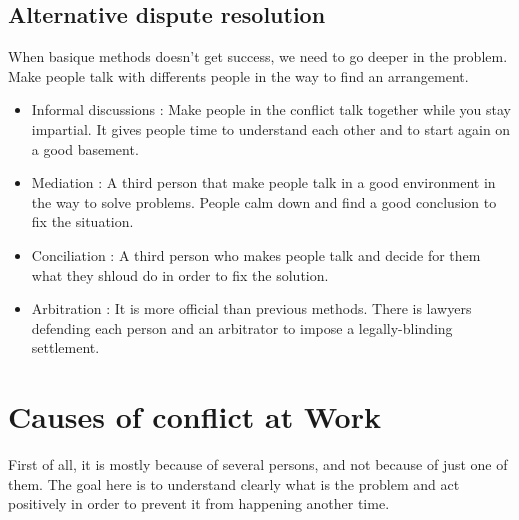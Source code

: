 \documentclass[a4paper,12pt]{report} %
\begin{document}
\subsection{Alternative dispute resolution}
When basique methods doesn't get success, we need to go deeper in the problem. Make people talk with differents people in the way to find an arrangement.
\begin{itemize}
\item Informal discussions : Make people in the conflict talk together while you stay impartial. It gives people time to understand each other and to start again on a good basement.
\item Mediation : A third person that make people talk in a good environment in the way to solve problems. People calm down and find a good conclusion to fix the situation.
\item Conciliation : A third person who makes people talk and decide for them what they shloud do in order to fix the solution.
\item Arbitration : It is more official than previous methods. There is lawyers defending each person and an arbitrator to impose a legally-blinding settlement.
\end{itemize}
\section{Causes of conflict at Work}
First of all, it is mostly because of several persons, and not because of just one of them. The goal here is to understand clearly what is the problem and act positively in order to prevent it from happening another time.
\end{document}
